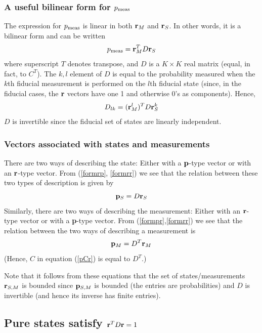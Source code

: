 \documentclass[10pt,twocolumn]{article}
\begin{document}
\subsubsection{A useful bilinear form for $p_{\rm meas}$}

The expression for $p_{\rm meas}$ is linear in both
${\bf r}_M$ and ${\bf r}_S$.  In other words, it is a bilinear form and can
be written
\begin{equation}\label{formrr}
   p_{\rm meas} = {\bf r}_M^T D {\bf r}_S
\end{equation}
where superscript $T$ denotes transpose, and
$D$ is a $K\times K$ real matrix (equal, in fact, to $C^T$).
The $k,l$ element of $D$ is
equal to the probability measured when the $k$th fiducial measurement is
performed on the $l$th fiducial state (since, in the fiducial cases,
the ${\bf r}$ vectors have one 1 and otherwise 0's as components).
Hence,
\begin{equation}\label{formfid}
D_{lk}=({\bf r}^l_M)^T D {\bf r}^k_S
\end{equation}
$D$ is invertible since the fiducial set of states are linearly
independent.

\subsubsection{Vectors associated with states and measurements}

There are two ways of describing the state:  Either with a ${\bf
p}$-type vector or with an ${\bf r}$-type vector.  From (\ref{formrp},
\ref{formrr}) we see that the relation between these two types of
description is given by
\begin{equation}\label{pDr}
{\bf p}_S = D {\bf r}_S
\end{equation}
Similarly, there are two ways of describing the measurement: Either with
an ${\bf r}$-type vector or with a {\bf p}-type vector.  From
(\ref{formpr},\ref{formrr}) we see that the relation
between the two ways of describing a measurement is
\begin{equation}
{\bf p}_M = D^T {\bf r}_M
\end{equation}
(Hence, $C$ in equation (\ref{pCr}) is equal to $D^T$.)

Note that it follows from these equations that the set of
states/measurements ${\bf r}_{S,M}$ is bounded since ${\bf p}_{S,M}$ is
bounded (the entries are probabilities) and $D$ is invertible (and hence
its inverse has finite entries).

\subsection{Pure states satisfy ${\bf r}^T D {\bf r}=1$}
\end{document}
